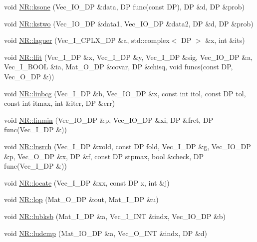 \begin{DoxyCompactItemize}
\item 
void \mbox{\hyperlink{namespaceNR_a3c53c1ee283bb33404deb730ff6a8d89}{N\+R\+::ksone}} (Vec\+\_\+\+I\+O\+\_\+\+DP \&data, DP func(const DP), DP \&d, DP \&prob)
\item 
void \mbox{\hyperlink{namespaceNR_a3ad9325c909f0cb757c462000c60a364}{N\+R\+::kstwo}} (Vec\+\_\+\+I\+O\+\_\+\+DP \&data1, Vec\+\_\+\+I\+O\+\_\+\+DP \&data2, DP \&d, DP \&prob)
\item 
void \mbox{\hyperlink{namespaceNR_aa2ea67c46e74229112bf024cfb9f6181}{N\+R\+::laguer}} (Vec\+\_\+\+I\+\_\+\+C\+P\+L\+X\+\_\+\+DP \&a, std\+::complex$<$ DP $>$ \&x, int \&its)
\item 
void \mbox{\hyperlink{namespaceNR_a0e8872f893cfdae1552954ed0ed82903}{N\+R\+::lfit}} (Vec\+\_\+\+I\+\_\+\+DP \&x, Vec\+\_\+\+I\+\_\+\+DP \&y, Vec\+\_\+\+I\+\_\+\+DP \&sig, Vec\+\_\+\+I\+O\+\_\+\+DP \&a, Vec\+\_\+\+I\+\_\+\+B\+O\+OL \&ia, Mat\+\_\+\+O\+\_\+\+DP \&covar, DP \&chisq, void funcs(const DP, Vec\+\_\+\+O\+\_\+\+DP \&))
\item 
void \mbox{\hyperlink{namespaceNR_af8b3348347ed7bf63c0554d522b33ee1}{N\+R\+::linbcg}} (Vec\+\_\+\+I\+\_\+\+DP \&b, Vec\+\_\+\+I\+O\+\_\+\+DP \&x, const int itol, const DP tol, const int itmax, int \&iter, DP \&err)
\item 
void \mbox{\hyperlink{namespaceNR_a4436a6bfba766ddda79e8cd4a8f1b977}{N\+R\+::linmin}} (Vec\+\_\+\+I\+O\+\_\+\+DP \&p, Vec\+\_\+\+I\+O\+\_\+\+DP \&xi, DP \&fret, DP func(Vec\+\_\+\+I\+\_\+\+DP \&))
\item 
void \mbox{\hyperlink{namespaceNR_adc216b076b35787786f44cc443e7533f}{N\+R\+::lnsrch}} (Vec\+\_\+\+I\+\_\+\+DP \&xold, const DP fold, Vec\+\_\+\+I\+\_\+\+DP \&g, Vec\+\_\+\+I\+O\+\_\+\+DP \&p, Vec\+\_\+\+O\+\_\+\+DP \&x, DP \&f, const DP stpmax, bool \&check, DP func(Vec\+\_\+\+I\+\_\+\+DP \&))
\item 
void \mbox{\hyperlink{namespaceNR_a219cd98096988ead11bcba867d300ebc}{N\+R\+::locate}} (Vec\+\_\+\+I\+\_\+\+DP \&xx, const DP x, int \&j)
\item 
void \mbox{\hyperlink{namespaceNR_a13418bcc862bf5ed4c010126e8cf8028}{N\+R\+::lop}} (Mat\+\_\+\+O\+\_\+\+DP \&out, Mat\+\_\+\+I\+\_\+\+DP \&u)
\item 
void \mbox{\hyperlink{namespaceNR_a1455a894979c7f2eaf3ef611a611cc42}{N\+R\+::lubksb}} (Mat\+\_\+\+I\+\_\+\+DP \&a, Vec\+\_\+\+I\+\_\+\+I\+NT \&indx, Vec\+\_\+\+I\+O\+\_\+\+DP \&b)
\item 
void \mbox{\hyperlink{namespaceNR_a71e8f8aa20cd167f6379653f60ccaa1a}{N\+R\+::ludcmp}} (Mat\+\_\+\+I\+O\+\_\+\+DP \&a, Vec\+\_\+\+O\+\_\+\+I\+NT \&indx, DP \&d)

\end{DoxyCompactItemize}
